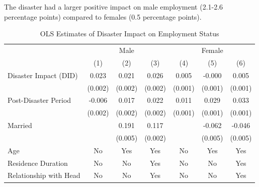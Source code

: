 \documentclass[serif, aspectratio=169]{beamer}
\begin{document}
\begin{frame}[label=employed]

The disaster had a larger positive impact on male employment (2.1-2.6 percentage points) compared to females (0.5 percentage points).

\begin{table}[htbp]
\centering
\caption{OLS Estimates of Disaster Impact on Employment Status}

\vspace{-0.2cm}


\begin{tabular}{@{}l*{6}{c}@{}}
          &\multicolumn{3}{c}{Male}                                &\multicolumn{3}{c}{Female}                              \\\cmidrule(lr){2-4}\cmidrule(lr){5-7}
          &\multicolumn{1}{c}{(1)}         &\multicolumn{1}{c}{(2)}         &\multicolumn{1}{c}{(3)}         &\multicolumn{1}{c}{(4)}         &\multicolumn{1}{c}{(5)}         &\multicolumn{1}{c}{(6)}         \\
\toprule
Disaster Impact (DID)&    0.023\sym{***}&    0.021\sym{***}&    0.026\sym{***}&    0.005\sym{***}&   -0.000         &    0.005\sym{***}\\
          &  (0.002)         &  (0.002)         &  (0.002)         &  (0.001)         &  (0.001)         &  (0.001)         \\
\addlinespace
Post-Disaster Period&   -0.006\sym{***}&    0.017\sym{***}&    0.022\sym{***}&    0.011\sym{***}&    0.029\sym{***}&    0.033\sym{***}\\
          &  (0.002)         &  (0.002)         &  (0.002)         &  (0.001)         &  (0.001)         &  (0.001)         \\
\addlinespace
Married   &                  &    0.191\sym{***}&    0.117\sym{***}&                  &   -0.062\sym{***}&   -0.046\sym{***}\\
          &                  &  (0.005)         &  (0.002)         &                  &  (0.005)         &  (0.005)         \\
\midrule
Age       &       No         &      Yes         &      Yes         &       No         &      Yes         &      Yes         \\
Residence Duration&       No         &       No         &      Yes         &       No         &       No         &      Yes         \\
Relationship with Head&       No         &       No         &      Yes         &       No         &       No         &      Yes         \\

\end{tabular}
\end{table}
\end{frame}
\end{document}
